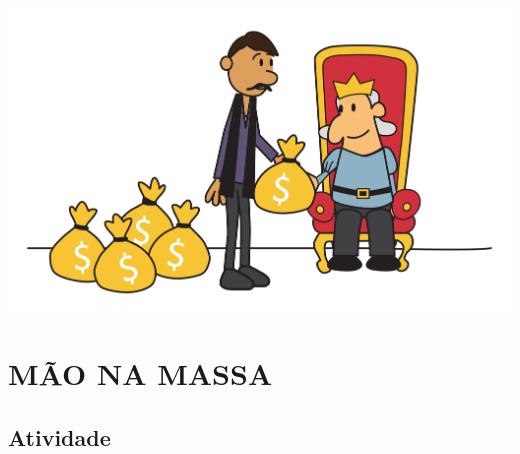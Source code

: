 \begin{center}
    \includegraphics[width=400pt, keepaspectratio]{../figuras/licao01/orgideias_fig05.png}
  \end{center}


\section{MÃO NA MASSA }

\subsection{Atividade}

